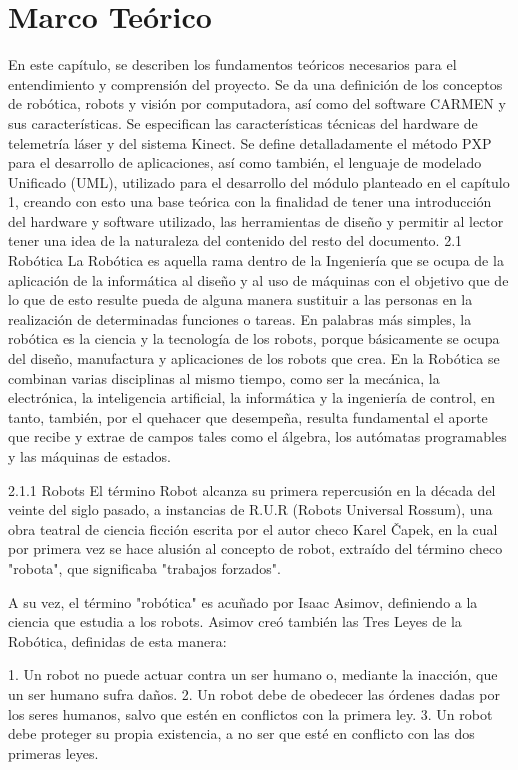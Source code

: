 \chapter{Marco Teórico}

En este capítulo, se describen los fundamentos teóricos necesarios para el entendimiento y comprensión del proyecto. Se da una definición de los conceptos de robótica, robots y visión por computadora, así como del software CARMEN y sus características. Se especifican las características técnicas del hardware de telemetría láser y del sistema Kinect. Se define detalladamente el método PXP para el desarrollo de aplicaciones, así como también, el lenguaje de modelado Unificado (UML), utilizado para el desarrollo del módulo planteado en el capítulo 1, creando con esto una base teórica con la finalidad de tener una introducción del hardware y software utilizado, las herramientas de diseño y permitir al lector tener una idea de la naturaleza del contenido del resto del documento.
2.1	Robótica
La Robótica es aquella rama dentro de la Ingeniería que se ocupa de la aplicación de la informática  al diseño y al uso de máquinas con el objetivo que de lo que de esto resulte pueda de alguna manera sustituir a las personas en la realización de determinadas funciones o tareas.
En palabras más simples, la robótica es la ciencia y la tecnología de los robots, porque básicamente se ocupa del diseño, manufactura y aplicaciones de los robots que crea. En la Robótica se combinan varias disciplinas al mismo tiempo, como ser la mecánica, la electrónica, la inteligencia artificial, la informática y la ingeniería de control, en tanto, también, por el quehacer que desempeña, resulta fundamental el aporte que recibe y extrae de campos tales como el álgebra, los autómatas programables y las máquinas de estados.

2.1.1	Robots
El término Robot alcanza su primera repercusión en la década del veinte del siglo pasado, a instancias de R.U.R (Robots Universal Rossum), una obra teatral de ciencia ficción escrita por el autor checo Karel Čapek, en la cual por primera vez se hace alusión al concepto de robot, extraído del término checo "robota", que significaba "trabajos forzados".

A su vez, el término "robótica" es acuñado por Isaac Asimov, definiendo a la ciencia que estudia a los robots. Asimov creó también las Tres Leyes de la Robótica, definidas de esta manera:

1.	Un robot no puede actuar contra un ser humano o, mediante la inacción, que un ser humano sufra daños.
2.	Un robot debe de obedecer las órdenes dadas por los seres humanos, salvo que estén en conflictos con la primera ley.
3.	Un robot debe proteger su propia existencia, a no ser que esté en conflicto con las dos primeras leyes.

